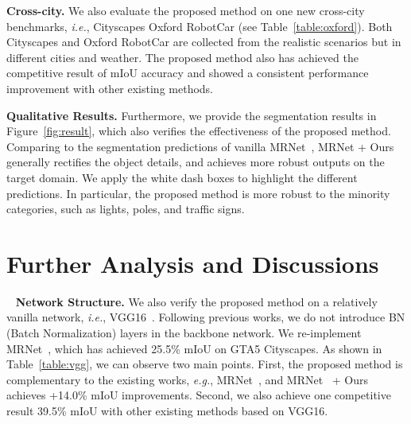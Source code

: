 \documentclass[journal]{IEEEtran}
\def\eg{\emph{e.g.}}
\def\ie{\emph{i.e.}}
\begin{document}
\noindent\textbf{Cross-city.} We also evaluate the proposed method on one new cross-city benchmarks, \ie, Cityscapes  Oxford RobotCar (see Table~\ref{table:oxford}). Both Cityscapes and Oxford RobotCar are collected from the realistic scenarios but in different cities and weather. The proposed method also has achieved the competitive result of  mIoU accuracy and showed a consistent performance improvement with other existing methods.


\noindent\textbf{Qualitative Results.} Furthermore, we provide  the segmentation results in Figure~\ref{fig:result}, 
which also verifies the effectiveness of the proposed method. Comparing to the segmentation predictions of vanilla MRNet~\cite{zheng2019unsupervised}, MRNet + Ours generally rectifies the object details, and achieves more robust outputs on the target domain. We apply the white dash boxes to highlight the different predictions. In particular, the proposed method is more robust to the minority categories, such as lights, poles, and traffic signs.

\section{Further Analysis and Discussions}~\label{sec:further}
\noindent\textbf{Network Structure.}
We also verify the proposed method on a relatively vanilla network, \ie, VGG16~\cite{simonyan2014very}. Following previous works, we do not introduce BN (Batch Normalization) layers in the backbone network. 
We re-implement MRNet~\cite{zheng2019unsupervised}, which has achieved 25.5\% mIoU on GTA5  Cityscapes. 
As shown in Table~\ref{table:vgg}, we can observe two main points. First, the proposed method is complementary to the existing works, \eg, MRNet~\cite{zheng2019unsupervised}, and MRNet~\cite{zheng2019unsupervised} + Ours achieves +14.0\% mIoU improvements. Second, we also achieve one competitive result 39.5\% mIoU with other existing methods based on VGG16.
\end{document}
